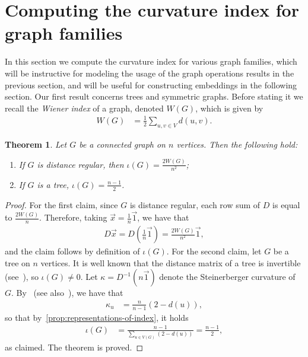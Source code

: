 \documentclass[11pt,a4paper]{article}
\newcommand{\distmatrix}{D}
\newcommand{\x}{\vec{x}}
\newcommand{\one}{\vec{1}}
\newtheorem{theorem}{Theorem}[section]
\begin{document}
    \section{Computing the curvature index for graph families}\label{sec:computing-index}

    In this section we compute the curvature index for various graph families, which will be instructive for modeling the usage of the graph operations results in the previous section, and will be useful for constructing embeddings in the following section. Our first result concerns trees and symmetric graphs. Before stating it we recall the \emph{Wiener index} of a graph, denoted $W(G)$, which is given by
        \begin{align*}
            W(G) &= \frac{1}{2} \sum_{u, v\in V} d(u, v).
        \end{align*}

    \begin{theorem}\label{thm:transitive-tree}
        Let $G$ be a connected graph on $n$ vertices. Then the following hold:
            \begin{enumerate}[label=(\roman*)]
                \item If $G$ is distance regular, then $\iota(G) = \frac{2W(G)}{n^2}$;
                \item If $G$ is a tree, $\iota(G) = \frac{n-1}{2}$.
            \end{enumerate}
    \end{theorem}

    \begin{proof}
        For the first claim, since $G$ is distance regular, each row sum of $\distmatrix$ is equal to $\frac{2W(G)}{n}$. Therefore, taking $\x = \frac{1}{n}\one$, we have that
            \begin{align*}
                \distmatrix\x = \distmatrix \left(\tfrac{1}{n}\one\right) = \frac{2W(G)}{n^2}\one,
            \end{align*}
        and the claim follows by definition of $\iota(G)$. For the second claim, let $G$ be a tree on $n$ vertices. It is well known that the distance matrix of a tree is invertible (see~\cite{graham1978distance}), so $\iota(G)\ne 0$. Let $\kappa = \distmatrix^{-1}(n\one)$ denote the Steinerberger curvature of $G$. By~\cite{chen2023steinerberger} (see also~\cite{robertson2024discrete}), we have that
            \begin{align*}
                \kappa_u &= \frac{n}{n-1}(2-d(u)),
            \end{align*}
        so that by~\cref{prop:representations-of-index}, it holds
            \begin{align*}
                \iota(G) &= \frac{n-1}{\sum_{u\in V(G)} (2-d(u))} = \frac{n-1}{2}, 
            \end{align*}
        as claimed. The theorem is proved.
    \end{proof}
\end{document}
